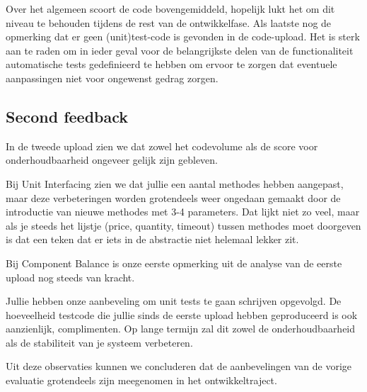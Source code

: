 Over het algemeen scoort de code bovengemiddeld, hopelijk lukt het om dit niveau te behouden tijdens de rest van de ontwikkelfase.
Als laatste nog de opmerking dat er geen (unit)test-code is gevonden in de code-upload.
Het is sterk aan te raden om in ieder geval voor de belangrijkste delen van de functionaliteit automatische tests gedefinieerd te hebben om ervoor te zorgen dat eventuele aanpassingen niet voor ongewenst gedrag zorgen.


\subsection{Second feedback}

In de tweede upload zien we dat zowel het codevolume als de score voor onderhoudbaarheid ongeveer gelijk zijn gebleven.

Bij Unit Interfacing zien we dat jullie een aantal methodes hebben aangepast, maar deze verbeteringen worden grotendeels weer ongedaan gemaakt door de introductie van nieuwe methodes met 3-4 parameters.
Dat lijkt niet zo veel, maar als je steeds het lijstje (price, quantity, timeout) tussen methodes moet doorgeven is dat een teken dat er iets in de abstractie niet helemaal lekker zit.

Bij Component Balance is onze eerste opmerking uit de analyse van de eerste upload nog steeds van kracht.

Jullie hebben onze aanbeveling om unit tests te gaan schrijven opgevolgd.
De hoeveelheid testcode die jullie sinds de eerste upload hebben geproduceerd is ook aanzienlijk, complimenten.
Op lange termijn zal dit zowel de onderhoudbaarheid als de stabiliteit van je systeem verbeteren.

Uit deze observaties kunnen we concluderen dat de aanbevelingen van de vorige evaluatie grotendeels zijn meegenomen in het ontwikkeltraject.